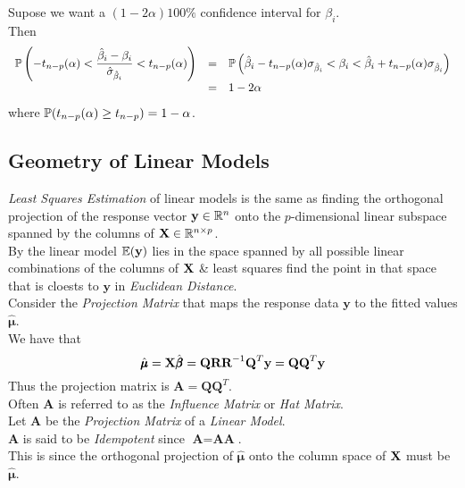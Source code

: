 \documentclass[11pt,a4paper]{article}
\begin{document}
Supose we want a $(1-2\alpha)100\%$ confidence interval for $\beta_i$.\\
Then
\[\begin{array}{rcl}
\mathbb{P}\left(-t_{n-p}(\alpha)<\dfrac{\hat\beta_i-\beta_i}{\hat\sigma_{\hat\beta_i}}<t_{n-p}(\alpha)\right)&=&\mathbb{P}\left(\hat\beta_i-t_{n-p}(\alpha)\sigma_{\hat\beta_i}<\beta_i<\hat\beta_i+t_{n-p}(\alpha)\sigma_{\hat\beta_i}\right)\\
&=&1-2\alpha
\end{array}\]
where $\mathbb{P}(t_{n-p}(\alpha)\geq t_{n-p})=1-\alpha$.\\

\subsection{Geometry of Linear Models}

\textit{Least Squares Estimation} of linear models is the same as finding the orthogonal projection of the response vector $\textbf{y}\in\mathbb{R}^n$ onto the $p$-dimensional linear subspace spanned by the columns of $\textbf{X}\in\mathbb{R}^{n\times p}$.\\
By the linear model $\mathbb{E}(\textbf{y})$ lies in the space spanned by all possible linear combinations of the columns of $\textbf{X}$ \& least squares find the point in that space that is cloests to $\textbf{y}$ in \textit{Euclidean Distance}.\\

Consider the \textit{Projection Matrix} that maps the response data $\textbf{y}$ to the fitted values $\hat{\pmb\mu}$.\\
We have that
$$\hat{\pmb\mu}=\textbf{X}\hat{\pmb\beta}=\textbf{QRR}^{-1}\textbf{Q}^T\textbf{y}=\textbf{QQ}^T\textbf{y}$$
Thus the projection matrix is $\textbf{A}=\textbf{QQ}^T$.\\
\nb Often $\textbf{A}$ is referred to as the \textit{Influence Matrix} or \textit{Hat Matrix}.\\

Let \textbf{A} be the \textit{Projection Matrix} of a \textit{Linear Model}.\\
$\textbf{A}$ is said to be \textit{Idempotent} since $\textbf{A}=\textbf{AA}$.\\
This is since the orthogonal projection of $\hat{\pmb\mu}$ onto the column space of $\textbf{X}$ must be $\hat{\pmb\mu}$.\\
\end{document}
